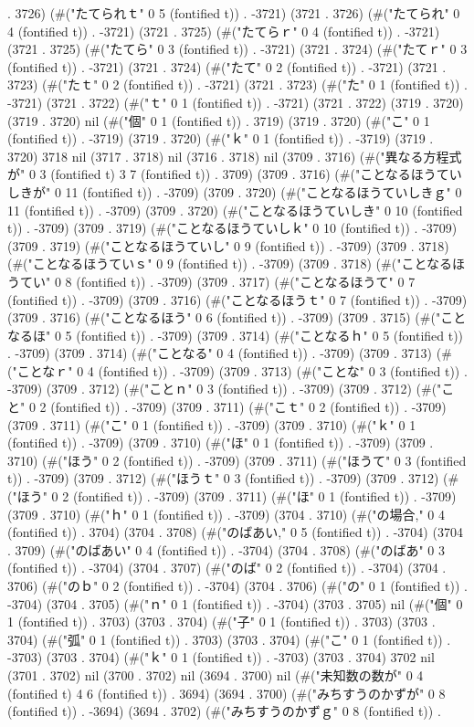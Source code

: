 . 3726) (#("たてられｔ" 0 5 (fontified t)) . -3721) (3721 . 3726) (#("たてられ" 0 4 (fontified t)) . -3721) (3721 . 3725) (#("たてらｒ" 0 4 (fontified t)) . -3721) (3721 . 3725) (#("たてら" 0 3 (fontified t)) . -3721) (3721 . 3724) (#("たてｒ" 0 3 (fontified t)) . -3721) (3721 . 3724) (#("たて" 0 2 (fontified t)) . -3721) (3721 . 3723) (#("たｔ" 0 2 (fontified t)) . -3721) (3721 . 3723) (#("た" 0 1 (fontified t)) . -3721) (3721 . 3722) (#("ｔ" 0 1 (fontified t)) . -3721) (3721 . 3722) (3719 . 3720) (3719 . 3720) nil (#("個" 0 1 (fontified t)) . 3719) (3719 . 3720) (#("こ" 0 1 (fontified t)) . -3719) (3719 . 3720) (#("ｋ" 0 1 (fontified t)) . -3719) (3719 . 3720) 3718 nil (3717 . 3718) nil (3716 . 3718) nil (3709 . 3716) (#("異なる方程式が" 0 3 (fontified t) 3 7 (fontified t)) . 3709) (3709 . 3716) (#("ことなるほうていしきが" 0 11 (fontified t)) . -3709) (3709 . 3720) (#("ことなるほうていしきｇ" 0 11 (fontified t)) . -3709) (3709 . 3720) (#("ことなるほうていしき" 0 10 (fontified t)) . -3709) (3709 . 3719) (#("ことなるほうていしｋ" 0 10 (fontified t)) . -3709) (3709 . 3719) (#("ことなるほうていし" 0 9 (fontified t)) . -3709) (3709 . 3718) (#("ことなるほうていｓ" 0 9 (fontified t)) . -3709) (3709 . 3718) (#("ことなるほうてい" 0 8 (fontified t)) . -3709) (3709 . 3717) (#("ことなるほうて" 0 7 (fontified t)) . -3709) (3709 . 3716) (#("ことなるほうｔ" 0 7 (fontified t)) . -3709) (3709 . 3716) (#("ことなるほう" 0 6 (fontified t)) . -3709) (3709 . 3715) (#("ことなるほ" 0 5 (fontified t)) . -3709) (3709 . 3714) (#("ことなるｈ" 0 5 (fontified t)) . -3709) (3709 . 3714) (#("ことなる" 0 4 (fontified t)) . -3709) (3709 . 3713) (#("ことなｒ" 0 4 (fontified t)) . -3709) (3709 . 3713) (#("ことな" 0 3 (fontified t)) . -3709) (3709 . 3712) (#("ことｎ" 0 3 (fontified t)) . -3709) (3709 . 3712) (#("こと" 0 2 (fontified t)) . -3709) (3709 . 3711) (#("こｔ" 0 2 (fontified t)) . -3709) (3709 . 3711) (#("こ" 0 1 (fontified t)) . -3709) (3709 . 3710) (#("ｋ" 0 1 (fontified t)) . -3709) (3709 . 3710) (#("ほ" 0 1 (fontified t)) . -3709) (3709 . 3710) (#("ほう" 0 2 (fontified t)) . -3709) (3709 . 3711) (#("ほうて" 0 3 (fontified t)) . -3709) (3709 . 3712) (#("ほうｔ" 0 3 (fontified t)) . -3709) (3709 . 3712) (#("ほう" 0 2 (fontified t)) . -3709) (3709 . 3711) (#("ほ" 0 1 (fontified t)) . -3709) (3709 . 3710) (#("ｈ" 0 1 (fontified t)) . -3709) (3704 . 3710) (#("の場合," 0 4 (fontified t)) . 3704) (3704 . 3708) (#("のばあい," 0 5 (fontified t)) . -3704) (3704 . 3709) (#("のばあい" 0 4 (fontified t)) . -3704) (3704 . 3708) (#("のばあ" 0 3 (fontified t)) . -3704) (3704 . 3707) (#("のば" 0 2 (fontified t)) . -3704) (3704 . 3706) (#("のｂ" 0 2 (fontified t)) . -3704) (3704 . 3706) (#("の" 0 1 (fontified t)) . -3704) (3704 . 3705) (#("ｎ" 0 1 (fontified t)) . -3704) (3703 . 3705) nil (#("個" 0 1 (fontified t)) . 3703) (3703 . 3704) (#("子" 0 1 (fontified t)) . 3703) (3703 . 3704) (#("弧" 0 1 (fontified t)) . 3703) (3703 . 3704) (#("こ" 0 1 (fontified t)) . -3703) (3703 . 3704) (#("ｋ" 0 1 (fontified t)) . -3703) (3703 . 3704) 3702 nil (3701 . 3702) nil (3700 . 3702) nil (3694 . 3700) nil (#("未知数の数が" 0 4 (fontified t) 4 6 (fontified t)) . 3694) (3694 . 3700) (#("みちすうのかずが" 0 8 (fontified t)) . -3694) (3694 . 3702) (#("みちすうのかずｇ" 0 8 (fontified t)) . 